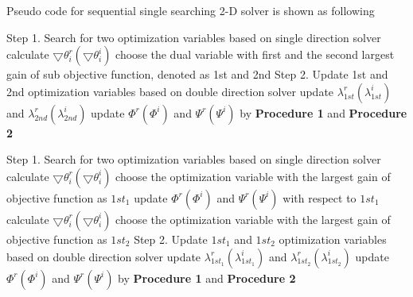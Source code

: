 \documentclass[12pt, draftclsnofoot, onecolumn]{IEEEtran}
\begin{document}
\begin{spacing}{2}
Pseudo code for sequential single searching 2-D solver is shown as following 
\begin{algorithm}[htb]
\begin{algorithmic}
\State Step 1. Search for two optimization variables based on single direction solver
\State calculate $\bigtriangledown \theta^{r}_{i}(\bigtriangledown \theta_{i}^{i})$
\EndFor
\State choose the dual variable with first and the second largest gain of sub objective function, denoted as 1st and 2nd
\State Step 2. Update 1st and 2nd optimization variables based on double direction solver 
\State update $\lambda^{r}_{1st}(\lambda^{i}_{1st})$ and $\lambda^{r}_{2nd}(\lambda^{i}_{2nd})$
\State update $\Phi^{r}(\Phi^{i})$ and $\Psi^{r}(\Psi^{i})$ by \textbf{Procedure 1} and \textbf{Procedure 2}
\EndProcedure
\end{algorithmic}
\label{1D2D Nodamping}
\end{algorithm} 
 
 
 \begin{algorithm}
\begin{algorithmic}
\State Step 1. Search for two optimization variables based on single direction solver
\State calculate $\bigtriangledown \theta_{i}^{r}(\bigtriangledown \theta_{i}^{i})$ 
\EndFor
\State choose the optimization variable with the largest gain of objective function as $1st_{1}$
\State update $\Phi^{r}(\Phi^{i})$ and $\Psi^{r}(\Psi^{i})$ with respect to $1st_{1}$
 
\State calculate $\bigtriangledown \theta_{i}^{r}(\bigtriangledown \theta_{i}^{i})$ 
\EndFor
\State choose the optimization variable with the largest gain of objective function as $1st_{2}$
\State Step 2. Update $1st_{1}$ and $1st_{2}$ optimization variables based on double direction solver 
\State update $\lambda^{r}_{1st_{1}}(\lambda^{i}_{1st_{1}})$ and $\lambda^{r}_{1st_{2}}(\lambda^{i}_{1st_{2}})$
\State update $\Phi^{r}(\Phi^{i})$ and $\Psi^{r}(\Psi^{i})$ by \textbf{Procedure 1} and \textbf{Procedure 2}


\end{algorithmic}
\end{algorithm}
\end{spacing}
\end{document}
